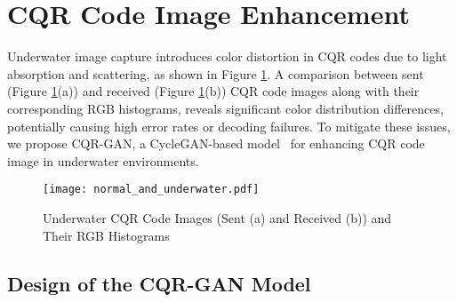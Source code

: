 \documentclass[preprint,12pt]{elsarticle}
\begin{document}
\section{CQR Code Image Enhancement}

Underwater image capture introduces color distortion in CQR codes due to light absorption and scattering, as shown in Figure \ref{normal_and_underwater}. A comparison between sent (Figure \ref{normal_and_underwater}(a)) and received (Figure \ref{normal_and_underwater}(b)) CQR code images  along with their corresponding RGB histograms, reveals significant color distribution differences, potentially causing high error rates or decoding failures. To mitigate these issues, we propose CQR-GAN, a CycleGAN-based model~\cite{zhu2020cyclegan} for enhancing CQR code image in underwater environments.

\begin{figure}[H]
\centering
\texttt{[image: normal\_and\_underwater.pdf]}
\caption{Underwater CQR Code Images (Sent (a) and Received (b)) and Their RGB Histograms}
\label{normal_and_underwater}
\end{figure}

\subsection{Design of the CQR-GAN Model}
\end{document}
